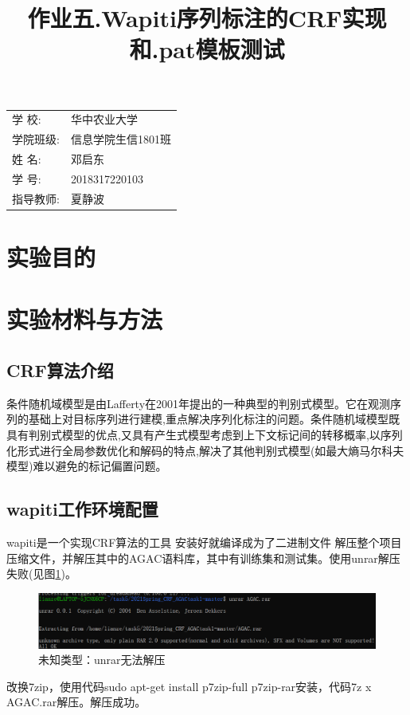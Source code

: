 \documentclass[12pt]{article}
\title{\heiti 作业五.Wapiti序列标注的CRF实现和.pat模板测试}
\begin{document}
	\maketitle
	
	\vspace{5cm}
	
	\begin{table}[h]
		\centering
		\begin{Large}
			\begin{tabular}{p{3cm} p{7cm}<{\centering}}
				学  \qquad  校: &  华中农业大学     \\ \cline{2-2}
				学院班级:      & 信息学院生信1801班   \\ \cline{2-2}
				姓  \qquad  名: & 邓启东 \\ \cline{2-2}
				学  \qquad  号: & 2018317220103 \\ \cline{2-2}
				指导教师:       &夏静波 \\ \cline{2-2}
			\end{tabular}
		\end{Large}		
	\end{table}
	
	\newpage%

	\tableofcontents
	
	\newpage
	\section{实验目的}

	\section{实验材料与方法}
\subsection{CRF算法介绍}
条件随机域模型是由Lafferty在2001年提出的一种典型的判别式模型。它在观测序列的基础上对目标序列进行建模,重点解决序列化标注的问题。条件随机域模型既具有判别式模型的优点,又具有产生式模型考虑到上下文标记间的转移概率,以序列化形式进行全局参数优化和解码的特点,解决了其他判别式模型(如最大熵马尔科夫模型)难以避免的标记偏置问题。
\subsection{wapiti工作环境配置}
wapiti是一个实现CRF算法的工具 安装好就编译成为了二进制文件
解压整个项目压缩文件，并解压其中的AGAC语料库，其中有训练集和测试集。使用unrar解压失败(见图\ref{mmm})。\par
\begin{figure}[H]
  \centering
  \includegraphics[scale=0.5]{./picture/unrar.png} %
  \caption{未知类型：unrar无法解压} %
  \label{mmm} %
\end{figure}
改换7zip，使用代码sudo apt-get install p7zip-full p7zip-rar安装，代码7z x AGAC.rar解压。解压成功。\par
\end{document}
